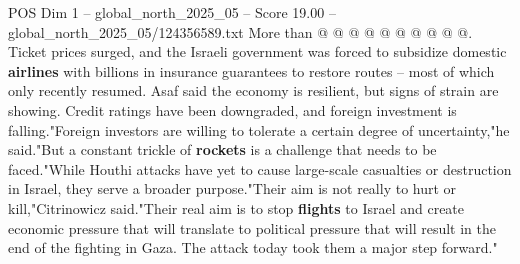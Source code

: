 \begin{textsample}{POS Dim 1 – global\_north\_2025\_05 – Score 19.00 – global\_north\_2025\_05/124356589.txt}
More than @ @ @ @ @ @ @ @ @ @.
Ticket prices surged, and the Israeli government was forced to subsidize domestic \textbf{airlines} with billions in insurance guarantees to restore routes -- most of which only recently resumed.
Asaf said the economy is resilient, but signs of strain are showing.
Credit ratings have been downgraded, and foreign investment is falling."Foreign investors are willing to tolerate a certain degree of uncertainty,"he said."But a constant trickle of \textbf{rockets} is a challenge that needs to be faced."While Houthi attacks have yet to cause large-scale casualties or destruction in Israel, they serve a broader purpose."Their aim is not really to hurt or kill,"Citrinowicz said."Their real aim is to stop \textbf{flights} to Israel and create economic pressure that will translate to political pressure that will result in the end of the fighting in Gaza.
The attack today took them a major step forward."

\end{textsample}
